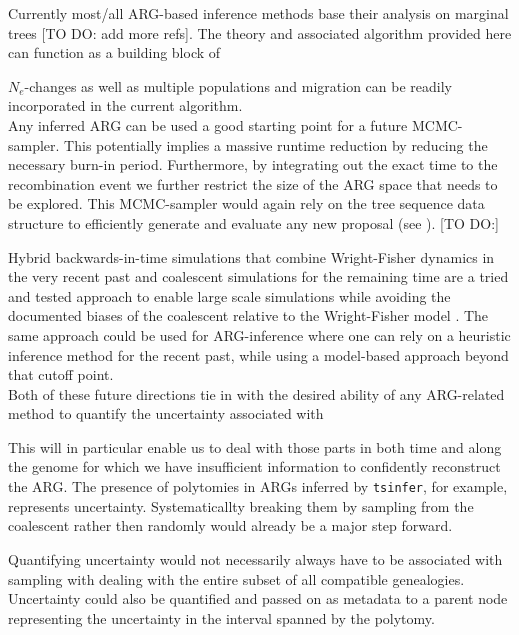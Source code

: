 \documentclass{article}
\newcommand{\tsinfer}[0]{\texttt{tsinfer}}
\begin{document}
Currently most/all ARG-based inference methods base their analysis on marginal 
trees \citep{hejase_2022} [TO DO: add more refs]. The theory and associated algorithm 
provided here can function as a building block of 
 
$N_e$-changes as well as multiple populations and migration can be readily incorporated 
in the current algorithm.\\

Any inferred ARG can be used a good starting point 
for a future MCMC-sampler. This potentially implies a massive runtime reduction by 
reducing the necessary burn-in period. Furthermore, by integrating out the exact time 
to the recombination event we further restrict the size of the ARG space that needs to 
be explored. This MCMC-sampler would again rely on the tree sequence data structure to 
efficiently generate and evaluate any new proposal (see \citep{mahmoudi_bayesian_2022}).
[TO DO:] 

Hybrid backwards-in-time simulations that combine Wright-Fisher dynamics in the 
very recent past and coalescent simulations for the remaining time are a tried and tested 
approach \citep{bhaskar_distortion_2014, nelson_accounting_2020} to enable large scale 
simulations while avoiding the documented biases of the coalescent relative to the 
Wright-Fisher model \citep{bhaskar_distortion_2014, wakeley_gene_2012}. The same approach 
could be used for ARG-inference where one can rely on a heuristic inference method for 
the recent past, while using a model-based approach beyond that cutoff point.\\

Both of these future directions tie in with the desired ability of any ARG-related method to 
quantify the uncertainty associated with 



This will in particular enable us to deal with those 
parts in both time and along the genome for which we have insufficient information to confidently 
reconstruct the ARG. The presence of polytomies in ARGs inferred by \tsinfer, for example, 
represents uncertainty. Systematicallty breaking them by sampling from the coalescent rather 
then randomly would already be a major step forward. 


Quantifying uncertainty would not necessarily always have to be associated 
with sampling 
with dealing with the entire subset of all compatible genealogies. Uncertainty could also 
be quantified and passed on as metadata to a parent node representing the uncertainty 
in the interval spanned by the polytomy.
\end{document}
